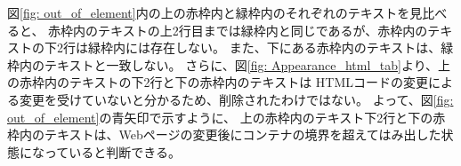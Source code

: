 図\ref{fig: out_of_element}内の上の赤枠内と緑枠内のそれぞれのテキストを見比べると、
赤枠内のテキストの上2行目までは緑枠内と同じであるが、赤枠内のテキストの下2行は緑枠内には存在しない。
また、下にある赤枠内のテキストは、緑枠内のテキストと一致しない。
さらに、図\ref{fig: Appearance_html_tab}より、上の赤枠内のテキストの下2行と下の赤枠内のテキストは
HTMLコードの変更による変更を受けていないと分かるため、削除されたわけではない。
よって、図\ref{fig: out_of_element}の青矢印で示すように、
上の赤枠内のテキスト下2行と下の赤枠内のテキストは、Webページの変更後にコンテナの境界を超えてはみ出した状態になっていると判断できる。
